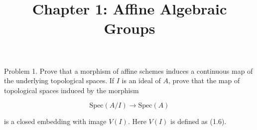 % 



\title{Chapter 1: Affine Algebraic Groups}


\maketitle

Problem 1. Prove that a morphism of affine schemes induces a continuous map of
the underlying topological spaces. If $I$ is an ideal of $A$, prove that the map
of topological spaces induced by the morphism

$$
\mathrm{Spec}(A/I) \to \mathrm{Spec}(A)
$$

is a closed embedding with image $V(I)$. Here $V(I)$ is defined as (1.6).

% 
% 


